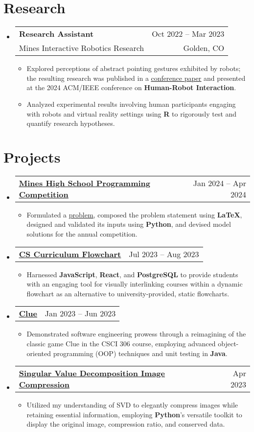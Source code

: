 \documentclass[letterpaper,11pt]{article}
\makeatletter
\newcommand{\resumeItem}[1]{
  \item\small{
    {#1 \vspace{-2pt}}
  }
}
\newcommand{\resumeSubheading}[4]{
  \vspace{-2pt}\item
    \begin{tabular*}{0.97\textwidth}[t]{l@{\extracolsep{\fill}}r}
      \textbf{#1} & {\small #2} \\
      {\small #3} & {\small #4} \\
    \end{tabular*}\vspace{-7pt}
}
\newcommand{\resumeProjectHeading}[2]{
    \item
    \begin{tabular*}{0.97\textwidth}{l@{\extracolsep{\fill}}r}
      \small{\textbf{#1}} & \small{#2} \\
    \end{tabular*}\vspace{-7pt}
}
\newcommand{\resumeSubHeadingListStart}{\begin{itemize}[leftmargin=0.15in, label={}]}
\newcommand{\resumeSubHeadingListEnd}{\end{itemize}}
\newcommand{\resumeItemListStart}{\begin{itemize}}
\newcommand{\resumeItemListEnd}{\end{itemize}\vspace{-5pt}}
\makeatother
\begin{document}
\section{Research}
    \resumeSubHeadingListStart
      \resumeSubheading
      {Research Assistant}{Oct 2022 -- Mar 2023}
      {Mines Interactive Robotics Research}{Golden, CO}
          \resumeItemListStart
            \resumeItem{Explored perceptions of abstract pointing gestures exhibited by robots; the resulting research was published in a \underline{\href{https://doi.org/10.1145/3610977.3634924}{conference paper}} and presented at the 2024 ACM/IEEE conference on \textbf{Human-Robot Interaction}.}\
            \resumeItem{Analyzed experimental results involving human participants engaging with robots and virtual reality settings using \textbf{R} to rigorously test and quantify research hypotheses.}
          \resumeItemListEnd
    \resumeSubHeadingListEnd
  
\section{Projects}
    \resumeSubHeadingListStart
      \resumeProjectHeading
          {\underline{\href{https://keenanschott.com/portfolio/\#project-hspc}{Mines High School Programming Competition}}}{Jan 2024 -- Apr 2024}
          \resumeItemListStart
            \resumeItem{Formulated a \href{https://mines-hspc.kattis.com/contests/mines-hspc24/problems/nostragglers}{\underline{problem}}, composed the problem statement using \textbf{\LaTeX}, designed and validated its inputs using \textbf{Python}, and devised model solutions for the annual competition.}
          \resumeItemListEnd
      \resumeProjectHeading
          {\underline{\href{https://keenanschott.com/portfolio/\#project-cs-curriculum-flowchart}{CS Curriculum Flowchart}}}{Jul 2023 -- Aug 2023}
          \resumeItemListStart
            \resumeItem{Harnessed \textbf{JavaScript}, \textbf{React}, and \textbf{PostgreSQL} to provide students with an engaging tool for visually interlinking courses within a dynamic flowchart as an alternative to university-provided, static flowcharts.}
          \resumeItemListEnd
      \resumeProjectHeading
          {\underline{\href{https://keenanschott.com/portfolio/\#project-clue}{Clue}}}{Jan 2023 -- Jun 2023}
          \resumeItemListStart
            \resumeItem{Demonstrated software engineering prowess through a reimagining of the classic game Clue in the CSCI 306 course, employing advanced object-oriented programming (OOP) techniques and unit testing in \textbf{Java}.}
          \resumeItemListEnd
      \resumeProjectHeading
          {\underline{\href{https://keenanschott.com/portfolio/\#project-svd}{Singular Value Decomposition Image Compression}}}{Apr 2023}
          \resumeItemListStart
            \resumeItem{Utilized my understanding of SVD to elegantly compress images while retaining essential information, employing \textbf{Python}'s versatile toolkit to display the original image, compression ratio, and conserved data.}
          \resumeItemListEnd
    \resumeSubHeadingListEnd
\end{document}
